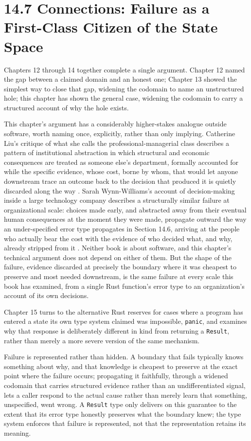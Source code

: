 \documentclass[11pt]{book}
\begin{document}
\section*{14.7 Connections: Failure as a First-Class Citizen of the State Space}

Chapters 12 through 14 together complete a single argument. Chapter 12 named the gap between a claimed domain and an honest one; Chapter 13 showed the simplest way to close that gap, widening the codomain to name an unstructured hole; this chapter has shown the general case, widening the codomain to carry a structured account of why the hole exists.

This chapter's argument has a considerably higher-stakes analogue outside software, worth naming once, explicitly, rather than only implying. Catherine Liu's critique of what she calls the professional-managerial class describes a pattern of institutional abstraction in which structural and economic consequences are treated as someone else's department, formally accounted for while the specific evidence, whose cost, borne by whom, that would let anyone downstream trace an outcome back to the decision that produced it is quietly discarded along the way \cite{liu2021}. Sarah Wynn-Williams's account of decision-making inside a large technology company describes a structurally similar failure at organizational scale: choices made early, and abstracted away from their eventual human consequences at the moment they were made, propagate outward the way an under-specified error type propagates in Section 14.6, arriving at the people who actually bear the cost with the evidence of who decided what, and why, already stripped from it \cite{wynnwilliams2025}. Neither book is about software, and this chapter's technical argument does not depend on either of them. But the shape of the failure, evidence discarded at precisely the boundary where it was cheapest to preserve and most needed downstream, is the same failure at every scale this book has examined, from a single Rust function's error type to an organization's account of its own decisions.

Chapter 15 turns to the alternative Rust reserves for cases where a program has entered a state its own type system claimed was impossible, \texttt{panic}, and examines why that response is deliberately different in kind from returning a \texttt{Result}, rather than merely a more severe version of the same mechanism.

\begin{invariantbox}
Failure is represented rather than hidden. A boundary that fails typically knows something about why, and that knowledge is cheapest to preserve at the exact point where the failure occurs; propagating it faithfully, through a widened codomain that carries structured evidence rather than an undifferentiated signal, lets a caller respond to the actual cause rather than merely learn that something, unspecified, went wrong. A \texttt{Result} type only delivers on this guarantee to the extent that its error type honestly preserves what the boundary knew; the type system enforces that failure is represented, not that the representation retains its meaning.
\end{invariantbox}
\end{document}
